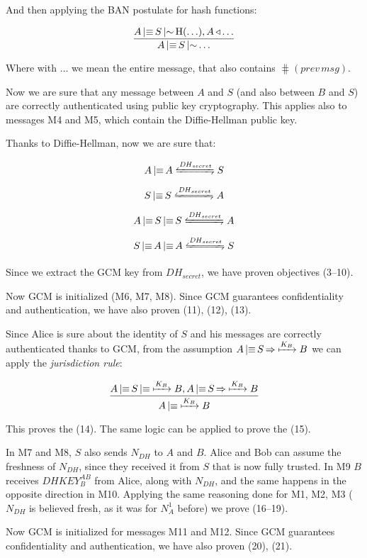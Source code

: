 And then applying the BAN postulate for hash functions:

\[
	\frac{A \operatorname{\mid\equiv} S \operatorname{\mid\sim} \operatorname{H}(\ldots), A \operatorname{\triangleleft} \ldots}
	{A \operatorname{\mid\equiv} S \operatorname{\mid\sim} \ldots}
\]

Where with \(\ldots\) we mean the entire message, that also contains
\(\hash(\mathit{prev\,msg})\).

Now we are sure that any message between \(A\) and \(S\) (and also between \(B\)
and \(S\)) are correctly authenticated using public key cryptography. This
applies also to messages M4 and M5, which contain the Diffie-Hellman public key.

Thanks to Diffie-Hellman, now we are sure that:

\[
	A \believes A \secret{\mathit{DH}_{secret}} S
\]
\[
	S \believes S \secret{\mathit{DH}_{secret}} A
\]
\[
	A \believes S \believes S \secret{\mathit{DH}_{secret}} A
\]
\[
	S \believes A \believes A \secret{\mathit{DH}_{secret}} S
\]

Since we extract the GCM key from \(\mathit{DH}_{secret}\), we have proven
objectives (3--10).

Now GCM is initialized (M6, M7, M8). Since GCM guarantees confidentiality and
authentication, we have also proven (11), (12), (13).

Since Alice is sure about the identity of \(S\) and his messages are correctly
authenticated thanks to GCM, from the assumption \(A \operatorname{\mid\equiv} S \operatorname{\Rightarrow}
\xmapsto{K_B} B\) we can apply the \emph{jurisdiction rule}:

\[
	\frac{A \operatorname{\mid\equiv} S \operatorname{\mid\equiv} \xmapsto{K_B} B, A \operatorname{\mid\equiv} S \operatorname{\Rightarrow} \xmapsto{K_B} B}
	{A \operatorname{\mid\equiv} \xmapsto{K_B} B}
\]

This proves the (14). The same logic can be applied to prove the (15).

In M7 and M8, \(S\) also sends \(N_{DH}\) to \(A\) and \(B\). Alice and Bob can
assume the freshness of \(N_{DH}\), since they received it from \(S\) that is
now fully trusted. In M9 \(B\) receives \(\mathit{DHKEY}_B^{AB}\) from Alice,
along with \(N_{DH}\), and the same happens in the opposite direction in M10.
Applying the same reasoning done for M1, M2, M3 (\(N_{DH}\) is believed fresh,
as it was for \(N_A^1\) before) we prove (16--19).

Now GCM is initialized for messages M11 and M12. Since GCM guarantees
confidentiality and authentication, we have also proven (20), (21).
